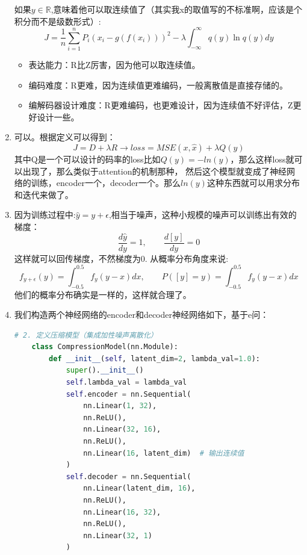 \documentclass[answers]{exam}  %
\begin{document}
\begin{enumerate}[label=\alph*.]
    如果$y\in \mathbb{R}$,意味着他可以取连续值了（其实我x的取值写的不标准啊，应该是个积分而不是级数形式）:
    \begin{equation*}
        J = \frac{1}{n} \sum_{i=1}^{n} P_i\left(x_i - g(f(x_i))\right)^2 - \lambda \int_{-\infty}^{\infty}q(y) \ln q(y) dy
    \end{equation*}

    \begin{itemize}
        \item 表达能力：R比Z厉害，因为他可以取连续值。
        \item 编码难度：R更难，因为连续值更难编码，一般离散值是直接存储的。
        \item 编解码器设计难度：R更难编码，也更难设计，因为连续值不好评估，Z更好设计一些。
    \end{itemize}

    \item 可以。根据定义可以得到：
    \begin{equation*}
        J = D + \lambda R \rightarrow loss = MSE(x,\hat{x}) + \lambda Q(y)
    \end{equation*}
    其中Q是一个可以设计的码率的loss比如$Q(y) = -ln(y)$，那么这样loss就可以出现了，那么类似于attention的机制那种，
    然后这个模型就变成了神经网络的训练，encoder一个，decoder一个。那么$ln(y)$这种东西就可以用求分布和迭代来做了。
    \item 因为训练过程中:$\hat{y} = y+  \epsilon$,相当于噪声，这种小规模的噪声可以训练出有效的梯度：
    \begin{equation*}
        \frac{d \hat{y}}{dy} = 1,\qquad  \frac{d[y]}{dy} = 0
    \end{equation*}
    这样就可以回传梯度，不然梯度为0. 从概率分布角度来说:
    \begin{equation*}
        f_{y+\epsilon}(y) = \int_{-0.5}^{0.5} f_y(y-x)dx , \qquad P([y] = y) = \int_{-0.5}^{0.5} f_y(y-x)dx
    \end{equation*}
    他们的概率分布确实是一样的，这样就合理了。
    \item 我们构造两个神经网络的encoder和decoder神经网络如下，基于e问：
    \begin{lstlisting}[language=python]
    # 2. 定义压缩模型（集成加性噪声离散化）
    class CompressionModel(nn.Module):
        def __init__(self, latent_dim=2, lambda_val=1.0):
            super().__init__()
            self.lambda_val = lambda_val
            self.encoder = nn.Sequential(
                nn.Linear(1, 32),
                nn.ReLU(),
                nn.Linear(32, 16),
                nn.ReLU(),
                nn.Linear(16, latent_dim)  # 输出连续值
            )
            self.decoder = nn.Sequential(
                nn.Linear(latent_dim, 16),
                nn.ReLU(),
                nn.Linear(16, 32),
                nn.ReLU(),
                nn.Linear(32, 1)
            )
        

\end{lstlisting}
\end{enumerate}
\end{document}
